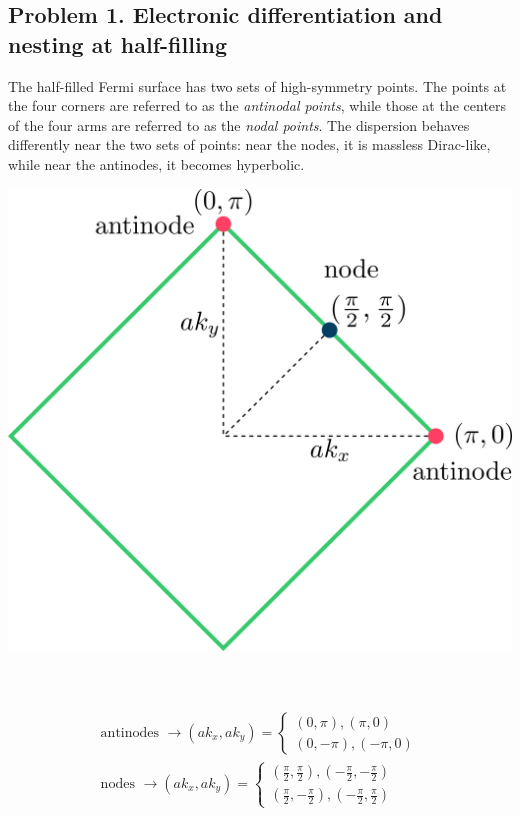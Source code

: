 \documentclass[12pt]{article}
\numberwithin{equation}{section}
\begin{document}
\subsection*{Problem 1. Electronic differentiation and nesting at half-filling}
\begin{minipage}{0.5\textwidth}
	The half-filled Fermi surface has two sets of high-symmetry points. The points at the four corners are referred to as the \textit{antinodal points}, while those at the centers of the four arms are referred to as the \textit{nodal points}. The dispersion behaves differently near the two sets of points: near the nodes, it is massless Dirac-like, while near the antinodes, it becomes hyperbolic.
\end{minipage}
\hspace*{\fill}
\begin{minipage}{0.4\textwidth}
	\centering
	\includegraphics[width=\textwidth]{./Fsurf.png}
\end{minipage}
\\\\
\begin{equation*}\begin{aligned}
	\text{antinodes } \to \left(ak_x, ak_y\right) = \begin{cases}
\left(0, \pi \right), \left(\pi, 0 \right)\\
\left(0, -\pi \right), \left(-\pi, 0\right)
	\end{cases}\\
		\text{nodes } \to \left(ak_x, ak_y\right) = \begin{cases}
		\left(\frac{\pi}{2}, \frac{\pi}{2} \right), \left(-\frac{\pi}{2}, -\frac{\pi}{2}\right)\\
		\left(\frac{\pi}{2}, -\frac{\pi}{2} \right), \left(-\frac{\pi}{2}, \frac{\pi}{2}\right)
	\end{cases}
\end{aligned}\end{equation*}
\end{document}
